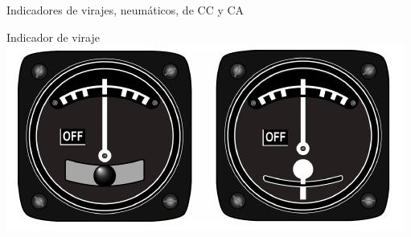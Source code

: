 \begin{frame}{Indicadores de virajes, neum\'aticos, de CC y CA}

  \begin{block}{Indicador de viraje}
       \includegraphics[width=0.85\linewidth]{05.instrumentos.giroscopicos.imagenes/05.02.indicadores.viraje.imagenes/indicador_viraje_03.jpg}
     \end{block}
\end{frame}


